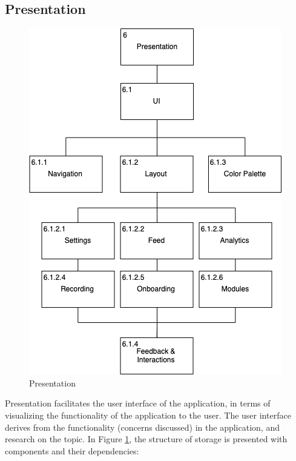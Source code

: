 \subsection{Presentation}
\begin{figure}
    \centering
    \includegraphics[scale=0.5]{images/Presentation.png}
    \caption{Presentation}
    \label{fig:hta_presentation}
\end{figure}

Presentation facilitates the user interface of the application, in terms of visualizing the functionality of the application to the user. The user interface derives from the functionality (concerns discussed) in the application, and research on the topic. In Figure \ref{fig:hta_presentation}, the structure of storage is presented with components and their dependencies: 


